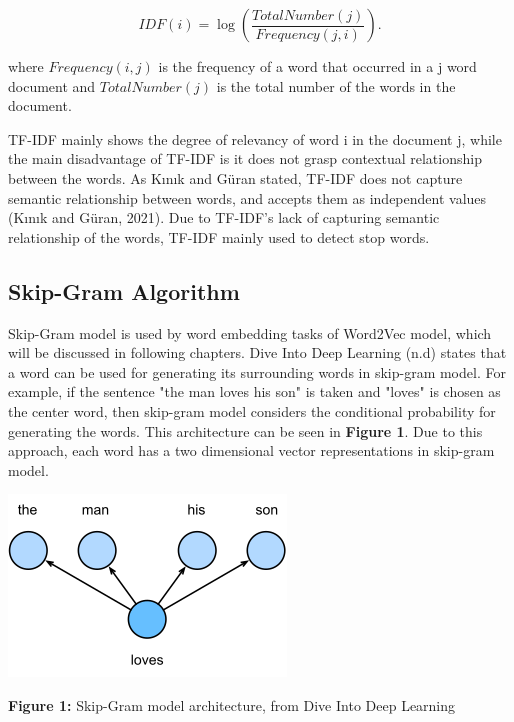 \documentclass[man]{apa7}
\begin{document}
\begin{equation}
IDF (i) = \log (\frac{TotalNumber(j)}{Frequency(j,i)}).
\end{equation}

where $Frequency(i,j)$ is the frequency of a word that occurred in a j word document and $TotalNumber(j)$ is the total number of the words in the document.

TF-IDF mainly shows the degree of relevancy of word i in the document j, while the main disadvantage of TF-IDF is it does not grasp contextual relationship between the words. As Kınık and Güran stated, TF-IDF does not capture semantic relationship between words, and accepts them as independent values (Kınık and Güran, 2021). Due to TF-IDF's lack of capturing semantic relationship of the words, TF-IDF mainly used to detect stop words.

\subsection{Skip-Gram Algorithm}

Skip-Gram model is used by word embedding tasks of Word2Vec model, which will be discussed in following chapters. Dive Into Deep Learning (n.d) states that a word can be used for generating its surrounding words in skip-gram model. For example, if the sentence "the man loves his son" is taken and "loves" is chosen as the center word, then skip-gram model considers the conditional probability for generating the words. This architecture can be seen in \textbf{Figure 1}. Due to this approach, each word has a two dimensional vector representations in skip-gram model. 

\begin{center}

\includegraphics[scale=1]{skip-gram.png}

\textbf{Figure 1:} Skip-Gram model architecture, from Dive Into Deep Learning\\[2\baselineskip]

\end{center}
\end{document}

